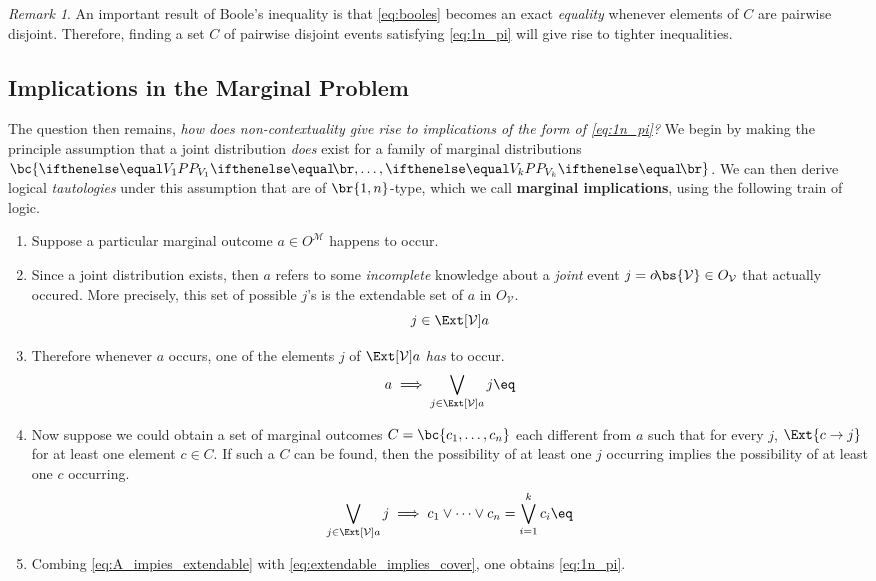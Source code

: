 \documentclass[aps, 10pt, english, twoside, pra, nofootinbib, longbibliography]{revtex4-1}
\theoremstyle{plain}
\theoremstyle{definition}
\theoremstyle{remark}
\newtheorem{remark}[theorem]{Remark}
\newcommand{\term}[1]{\textcolor{Mahogany}{\textbf{#1}}}
\newcommand{\outc}[1]{o\!\bs{#1}}
\begin{document}
    \begin{remark}
        An important result of Boole's inequality is that \cref{eq:booles} becomes an exact \textit{equality} whenever elements of $C$ are pairwise disjoint. Therefore, finding a set $C$ of pairwise disjoint events satisfying \cref{eq:1n_pi} will give rise to tighter inequalities.
    \end{remark}

    \subsection{Implications in the Marginal Problem}

    The question then remains, \textit{how does non-contextuality give rise to implications of the form of \cref{eq:1n_pi}?} We begin by making the principle assumption that a joint distribution \textit{does} exist for a family of marginal distributions $\bc{\prob[V_1], \ldots, \prob[V_k]}$. We can then derive logical \textit{tautologies} under this assumption that are of $\br{1,n}$-type, which we call \term{marginal implications}, using the following train of logic.
    \begin{enumerate}
        \item Suppose a particular marginal outcome $a \in O^{\mathcal{M}}$ happens to occur.
        \item Since a joint distribution exists, then $a$ refers to some \textit{incomplete} knowledge about a \textit{joint} event $j = \outc{\mathcal{V}} \in O_{\mathcal{V}}$ that actually occured. More precisely, this set of possible $j$'s is the extendable set of $a$ in $O_{\mathcal{V}}$.
        \[ j \in \Ext[\mathcal{V}]{a} \]
        \item Therefore whenever $a$ occurs, one of the elements $j$ of $\Ext[\mathcal{V}]{a}$ \textit{has} to occur.
        \[ a \implies \bigvee_{j \in \Ext[\mathcal{V}]{a}} j \eq \label{eq:A_impies_extendable}\]
        \item Now suppose we could obtain a set of marginal outcomes $C = \bc{c_1, \ldots, c_n}$ each different from $a$ such that for every $j$, $\Ext{c \to j}$ for at least one element $c \in C$. If such a $C$ can be found, then the possibility of at least one $j$ occurring implies the possibility of at least one $c$ occurring.
        \[ \bigvee_{j \in \Ext[\mathcal{V}]{a}} j \implies c_1 \vee \cdots \vee c_n = \bigvee_{i = 1}^{k} c_i\eq \label{eq:extendable_implies_cover} \]

        \item Combing \cref{eq:A_impies_extendable} with \cref{eq:extendable_implies_cover}, one obtains \cref{eq:1n_pi}.
    \end{enumerate}
\end{document}

